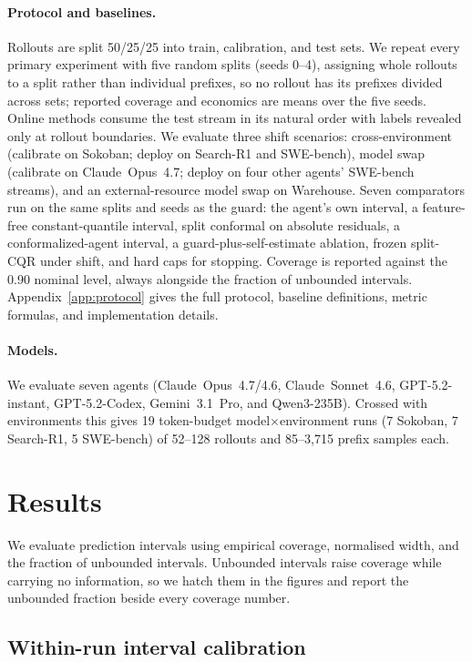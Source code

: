 \documentclass{article}
\begin{document}
\paragraph{Protocol and baselines.}
Rollouts are split 50/25/25 into train, calibration, and test sets. We repeat every primary experiment with five random splits (seeds 0--4), assigning whole rollouts to a split rather than individual prefixes, so no rollout has its prefixes divided across sets; reported coverage and economics are means over the five seeds. Online methods consume the test stream in its natural order with labels revealed only at rollout boundaries. We evaluate three shift scenarios: cross-environment (calibrate on Sokoban; deploy on Search-R1 and SWE-bench), model swap (calibrate on Claude~Opus~4.7; deploy on four other agents' SWE-bench streams), and an external-resource model swap on Warehouse. Seven comparators run on the same splits and seeds as the guard: the agent's own interval, a feature-free constant-quantile interval, split conformal on absolute residuals, a conformalized-agent interval, a guard-plus-self-estimate ablation, frozen split-CQR under shift, and hard caps for stopping. Coverage is reported against the 0.90 nominal level, always alongside the fraction of unbounded intervals. Appendix~\ref{app:protocol} gives the full protocol, baseline definitions, metric formulas, and implementation details.

\paragraph{Models.}
We evaluate seven agents (Claude~Opus~4.7/4.6, Claude~Sonnet~4.6, GPT-5.2-instant, GPT-5.2-Codex, Gemini~3.1~Pro, and Qwen3-235B). Crossed with environments this gives 19 token-budget model$\times$environment runs (7 Sokoban, 7 Search-R1, 5 SWE-bench) of 52--128 rollouts and 85--3{,}715 prefix samples each.

\section{Results}
\label{sec:results}
\raggedbottom

We evaluate prediction intervals using empirical coverage, normalised width, and the fraction of unbounded intervals. Unbounded intervals raise coverage while carrying no information, so we hatch them in the figures and report the unbounded fraction beside every coverage number.

\subsection{Within-run interval calibration}
\label{sec:within}
\end{document}
